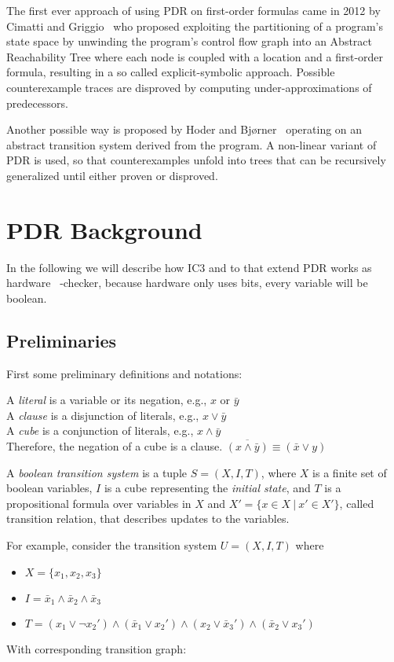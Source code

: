 \documentclass[11pt, a4paper, BCOR=10mm, ngerman, oneside]{scrbook}
\begin{document}
The first ever approach of using PDR on first-order formulas came in 2012 by Cimatti and Griggio~\cite{DBLP:conf/cav/CimattiG12} who proposed exploiting the partitioning of a program's state space by unwinding the program's control flow graph into an Abstract Reachability Tree where each node is coupled with a location and a first-order formula, resulting in a so called explicit-symbolic approach. Possible counterexample traces are disproved by computing under-approximations of predecessors. 

Another possible way is proposed by Hoder and Bj{\o}rner~\cite{DBLP:conf/sat/HoderB12} operating on an abstract transition system derived from the program. A non-linear variant of PDR is used, so that counterexamples unfold into trees that can be recursively generalized until either proven or disproved.







\chapter{PDR Background}
\label{PDR}
In the following we will describe how IC3 and to that extend PDR works as hardware \ -checker,
because hardware only uses bits, every variable will be boolean. 
\section{Preliminaries}
First some preliminary definitions and notations:  \par
A \textsl{literal} is a variable or its negation, e.g., $x \text{ or } \bar y$ \\
A \textsl{clause} is a disjunction of literals, e.g., $x \lor \bar y$ \\
A \textsl{cube} is a conjunction of literals, e.g.,  $x \land \bar y$ \\
Therefore, the negation of a cube is a clause. $\overline{(x \land \bar y)} \equiv (\bar x \lor y)$  \par
A \textsl{boolean transition system} is a tuple $S = (X, I, T)$, where $X$ is a finite set of boolean variables, $I$ is a cube representing the \textsl{initial state}, and $T$ is a propositional formula over variables in $X$ and $X' = \{x \in X \ | \ x' \in X'\}$, called transition relation, that describes updates to the variables.
\par
For example, consider the transition system $U = (X, I, T)$ where
\begin{itemize}
\item $ X= \{x_1, x_2, x_3\}$
\item $I = \bar x_1 \land \bar x_2 \land \bar x_3$
\item $T = (x_1 \lor \neg x_2' ) \land ( \bar x_1 \lor x_2') \land (x_2 \lor \bar x_3') \land ( \bar x_2 \lor x_3')$
\end{itemize}
\pagebreak
With corresponding transition graph:
\end{document}
